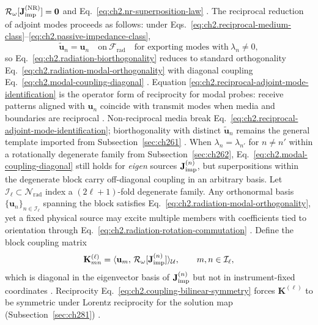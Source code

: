 \(\mathcal{R}_\omega[\mathbf{J}_{\mathrm{imp}}^{\mathrm{(NR)}}]=\mathbf{0}\) and
Eq.~\eqref{eq:ch2.nr-superposition-law} \cite{stratton1941}. The reciprocal reduction of adjoint modes proceeds as follows: under Eqs.~\eqref{eq:ch2.reciprocal-medium-class}--\eqref{eq:ch2.passive-impedance-class},
\begin{equation}
\label{eq:ch2.reciprocal-adjoint-mode-identification}
\widetilde{\mathbf{u}}_n=\mathbf{u}_n
\quad\text{on}\ \mathcal{F}_{\mathrm{rad}}
\quad\text{for exporting modes with}\ \lambda_n\neq 0,
\end{equation}
so Eq.~\eqref{eq:ch2.radiation-biorthogonality} reduces to standard orthogonality
Eq.~\eqref{eq:ch2.radiation-modal-orthogonality} with diagonal coupling
Eq.~\eqref{eq:ch2.modal-coupling-diagonal} \cite{stratton1941}. Equation
\eqref{eq:ch2.reciprocal-adjoint-mode-identification} is the operator form of reciprocity for
modal probes: receive patterns aligned with \(\mathbf{u}_n\) coincide with transmit modes
when media and boundaries are reciprocal \cite{harrington2001}. Non-reciprocal
media break Eq.~\eqref{eq:ch2.reciprocal-adjoint-mode-identification}; biorthogonality with
distinct \(\widetilde{\mathbf{u}}_n\) remains the general template imported from
Subsection~\ref{sec:ch261} \cite{stratton1941}. When \(\lambda_n=\lambda_{n'}\) for \(n\neq n'\) within a rotationally degenerate family from
Subsection~\ref{sec:ch262}, Eq.~\eqref{eq:ch2.modal-coupling-diagonal} still holds for
\emph{eigen} sources \(\mathbf{J}_{\mathrm{imp}}^{(n)}\), but superpositions within the degenerate block carry
off-diagonal coupling in an arbitrary basis. Let \(\mathcal{I}_\ell\subset\mathcal{N}_{\mathrm{rad}}\)
index a \((2\ell+1)\)-fold degenerate family. Any orthonormal basis
\(\{\mathbf{u}_n\}_{n\in\mathcal{I}_\ell}\) spanning the block satisfies
Eq.~\eqref{eq:ch2.radiation-modal-orthogonality}, yet a fixed physical source may excite
multiple members with coefficients tied to orientation through
Eq.~\eqref{eq:ch2.radiation-rotation-commutation} \cite{stratton1941}. Define
the block coupling matrix
\begin{equation}
\label{eq:ch2.degenerate-block-coupling-matrix}
\mathbf{K}^{(\ell)}_{mn}
=
\langle \mathbf{u}_m,\,\mathcal{R}_\omega[\mathbf{J}_{\mathrm{imp}}^{(n)}]\rangle_{\mathcal{U}},
\qquad
m,n\in\mathcal{I}_\ell,
\end{equation}
which is diagonal in the eigenvector basis of \(\mathbf{J}_{\mathrm{imp}}^{(n)}\) but not in instrument-fixed
coordinates \cite{stratton1941}. Reciprocity
Eq.~\eqref{eq:ch2.coupling-bilinear-symmetry} forces \(\mathbf{K}^{(\ell)}\) to be symmetric
under Lorentz reciprocity for the solution map (Subsection~\ref{sec:ch281}) \cite{stratton1941}.
